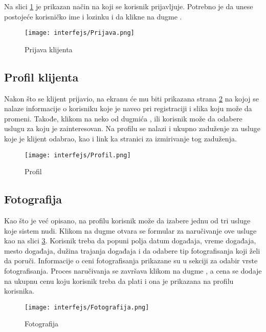 \documentclass[a4paper]{article}
\begin{document}
Na slici \ref{fig:ki_prijava} je prikazan način na koji se korisnik prijavljuje. Potrebno je da unese postojeće korisničko ime i lozinku i da klikne na dugme .

\begin{figure}[H]
    \centering
    \texttt{[image: interfejs/Prijava.png]}
    \caption{Prijava klijenta}
    \label{fig:ki_prijava}
\end{figure}

\subsection{Profil klijenta}

Nakon što se klijent prijavio, na ekranu će mu biti prikazana strana \ref{fig:ki_profil} na kojoj se nalaze informacije o korisniku koje je naveo pri registraciji i slika koju može da promeni. Takođe, klikom na neko od dugmića ,   ili  korisnik može da odabere uslugu za koju je zainteresovan. Na profilu se nalazi i ukupno zaduženje za usluge koje je klijent odabrao, kao i link  ka stranici za izmirivanje tog zaduženja.


\begin{figure}[H]
    \centering
    \texttt{[image: interfejs/Profil.png]}
    \caption{Profil}
    \label{fig:ki_profil}
\end{figure}

\subsection{Fotografija}

Kao što je već opisano, na profilu korisnik može da izabere jednu od tri usluge koje sistem nudi. Klikom na dugme  otvara se formular za naručivanje ove usluge kao na slici \ref{fig:ki_fotografija}. Korisnik treba da popuni polja datum događaja, vreme događaja, mesto događaja, dužina trajanja događaja i da odabere tip fotografisanja koji želi da poruči. Informacije o ceni fotografisanja prikazane su u sekciji za odabir vrste fotografisanja. Proces naručivanja se završava klikom na dugme , a cena se dodaje na ukupnu cenu koju korisnik treba da plati i ona je prikazana na profilu korisnika. 

\begin{figure}[H]
    \centering
    \texttt{[image: interfejs/Fotografija.png]}
    \caption{Fotografija}
    \label{fig:ki_fotografija}
\end{figure}
\end{document}
